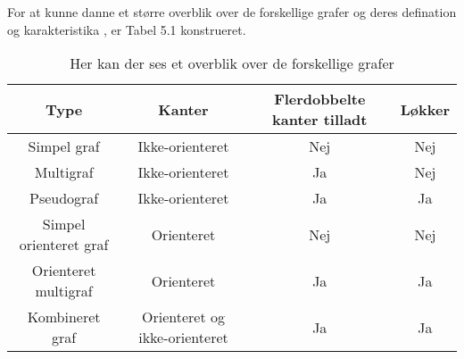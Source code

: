 \noindent For at kunne danne et større overblik over de forskellige grafer og deres defination og karakteristika , er Tabel 5.1 konstrueret.

\begin{table}[h]
\begin{tabular}{|c|c|c|c|}
\hline 
Type & Kanter & Flerdobbelte kanter tilladt & Løkker \\ 
\hline
Simpel graf & Ikke-orienteret & Nej & Nej	 \\ 

Multigraf & Ikke-orienteret & Ja & Nej \\ 

Pseudograf & Ikke-orienteret & Ja & Ja \\ 
 
Simpel orienteret graf & Orienteret & Nej & Nej \\ 
 
Orienteret multigraf & Orienteret & Ja & Ja \\ 
 
Kombineret graf & Orienteret og ikke-orienteret & Ja & Ja \\ 
\hline 
\end{tabular}
\caption{Her kan der ses et overblik over de forskellige grafer} \label{table:graf_oversigt}
\end{table}



 